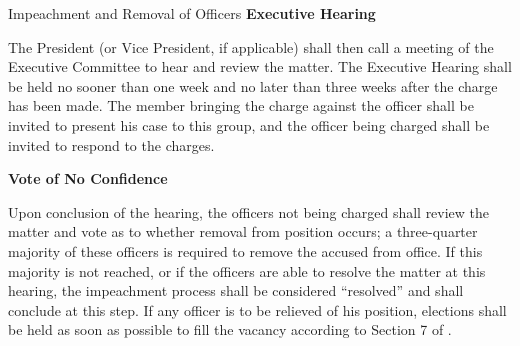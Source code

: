 {\begin{article}{Impeachment and Removal of Officers}
	\hypertarget{Executive Hearing}{}
	\textbf{Executive Hearing}

	The President (or Vice President, if applicable) shall then call a meeting of the Executive Committee to hear and review the matter. The Executive Hearing shall be held no sooner than one week and no later than three weeks after the charge has been made. The member bringing the charge against the officer shall be invited to present his case to this group, and the officer being charged shall be invited to respond to the charges.

	\hypertarget{Vote of No Confidence}{}
	\textbf{Vote of No Confidence}

	Upon conclusion of the hearing, the officers not being charged shall review the matter and vote as to whether removal from position occurs; a three-quarter majority of these officers is required to remove the accused from office. If this majority is not reached, or if the officers are able to resolve the matter at this hearing, the impeachment process shall be considered \enquote{resolved} and shall conclude at this step. If any officer is to be relieved of his position, elections shall be held as soon as possible to fill the vacancy according to Section 7 of .
\end{article}
}